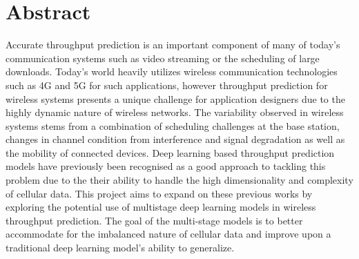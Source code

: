 \chapter{Abstract}
Accurate throughput prediction is an important component of many of today's communication systems such as video streaming or the scheduling of large downloads. Today's world heavily utilizes wireless communication technologies such as 4G and 5G for such applications, however throughput prediction for wireless systems presents a unique challenge for application designers due to the highly dynamic nature of wireless networks. The variability observed in wireless systems stems from a combination of scheduling challenges at the base station, changes in channel condition from interference and signal degradation as well as the mobility of connected devices. Deep learning based throughput prediction models have previously been recognised as a good approach to tackling this problem due to the their ability to handle the high dimensionality and complexity of cellular data. This project aims to expand on these previous works by exploring the potential use of multistage deep learning models in wireless throughput prediction. The goal of the multi-stage models is to better accommodate for the imbalanced nature of cellular data and improve upon a traditional deep learning model's ability to generalize. 
